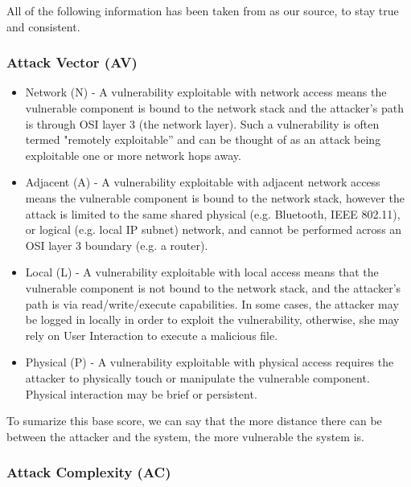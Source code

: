 All of the following information has been taken from \parencite{cvss3} as our source, to stay true and consistent.

\subsubsection{Attack Vector (AV)}

\begin{itemize}
	\item Network (N) - A vulnerability exploitable with network access means the vulnerable component is bound to the network stack and the attacker's path is through OSI layer 3 (the network layer). Such a vulnerability is often termed "remotely exploitable” and can be thought of as an attack being exploitable one or more network hops away.
	\item Adjacent (A) - A vulnerability exploitable with adjacent network access means the vulnerable component is bound to the network stack, however the attack is limited to the same shared physical (e.g. Bluetooth, IEEE 802.11), or logical (e.g. local IP subnet) network, and cannot be performed across an OSI layer 3 boundary (e.g. a router).
	\item Local (L) - A vulnerability exploitable with local access means that the vulnerable component is not bound to the network stack, and the attacker’s path is via read/write/execute capabilities. In some cases, the attacker may be logged in locally in order to exploit the vulnerability, otherwise, she may rely on User Interaction to execute a malicious file.
	\item Physical (P) - A vulnerability exploitable with physical access requires the attacker to physically touch or manipulate the vulnerable component. Physical interaction may be brief or persistent.
\end{itemize}

To sumarize this base score, we can say that the more distance there can be between the attacker and the system, the more vulnerable the system is.

\subsubsection{Attack Complexity (AC)}

